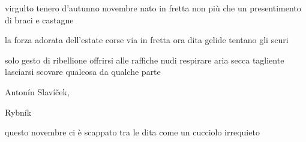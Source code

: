 \begin{volumetitlepage}
	\bigskip\bigskip\bigskip
\end{volumetitlepage}


\begin{poem}
	\begin{stanza}
		virgulto tenero d’autunno\verseline
		novembre nato in fretta\verseline
		non più che un presentimento\verseline
		di braci e castagne
	\end{stanza}

	\begin{stanza}
		la forza adorata dell’estate\verseline
		corse via in fretta\verseline
		ora dita gelide tentano gli scuri
	\end{stanza}
\end{poem}

\clearpage


\begin{poem}
	\begin{stanza}
		solo gesto di ribellione\verseline
		offrirsi alle raffiche nudi\verseline
		respirare aria secca tagliente\verseline
		lasciarsi scovare qualcosa\verseline
		da qualche parte
	\end{stanza}
\end{poem}

\clearpage


\begin{artItem}
	Antonín Slavíček, \begin{otherlanguage}{czech}%
		Rybník%
	\end{otherlanguage}
\end{artItem}

\begin{poem}
	\begin{stanza}
		questo novembre\verseline
		ci è scappato tra le dita\verseline
		come un cucciolo irrequieto
	\end{stanza}
\end{poem}

\clearpage

